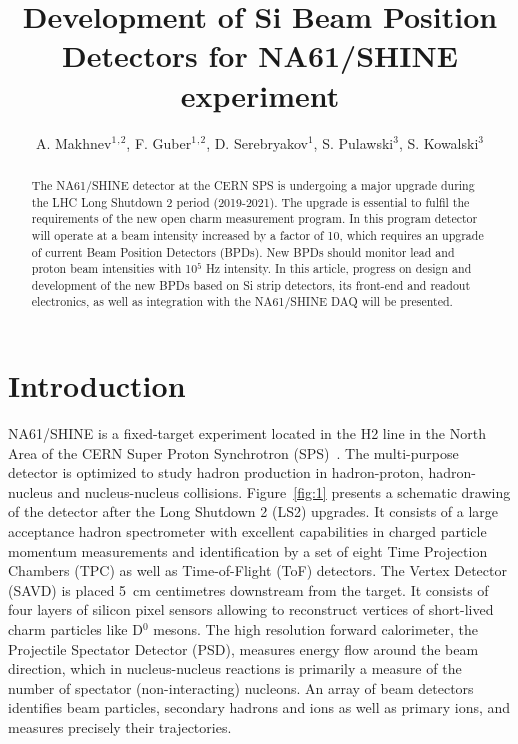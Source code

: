 \documentclass[a4paper]{jpconf}
\begin{document}
\title{Development of Si Beam Position Detectors for NA61/SHINE experiment}

\author{A. Makhnev$^1$$^,$$^2$, F. Guber$^1$$^,$$^2$, D. Serebryakov$^1$, S. Pulawski$^3$, S. Kowalski$^3$}

\address{$^1$Institute for Nuclear Research RAS, Moscow, Russia}
\address{$^2$Moscow Institute of Physics and Technology, Dolgoprudny, Moscow Region, Russia}
\address{$^3$Institute of Physics, University of Silesia, Chorzów, Poland}


\begin{abstract}
The NA61/SHINE detector at the CERN SPS is undergoing a major upgrade during the LHC Long Shutdown 2 period (2019-2021). The upgrade is essential to fulfil the requirements of the new open charm measurement program. In this program detector will operate at a beam intensity increased by a factor of 10, which requires an upgrade of current Beam Position Detectors (BPDs). New BPDs should monitor lead and proton beam intensities with 10$^5$ Hz intensity. In this article, progress on design and development of the new BPDs based on Si strip detectors, its front-end and readout electronics, as well as integration with the NA61/SHINE DAQ will be presented.
\end{abstract}

\section{Introduction}

NA61/SHINE is a fixed-target experiment located in the H2 line in the North Area of the CERN Super Proton Synchrotron (SPS)~\cite{Abgrall:2014fa}. The multi-purpose detector is optimized to study hadron production in hadron-proton, hadron-nucleus and nucleus-nucleus collisions. Figure~\ref{fig:1} presents a schematic drawing of the detector after the Long Shutdown 2 (LS2) upgrades. It consists of a large acceptance hadron spectrometer with excellent capabilities in charged particle momentum measurements and identification by a set of eight Time Projection Chambers (TPC) as well as Time-of-Flight (ToF) detectors. The Vertex Detector (SAVD) is placed 5~cm centimetres downstream from the target. It consists of four layers of silicon pixel sensors allowing to reconstruct vertices of short-lived charm particles like D$^0$ mesons. The high resolution forward calorimeter, the Projectile Spectator Detector (PSD), measures energy flow around the beam direction, which in nucleus-nucleus reactions is primarily a measure of the number of spectator (non-interacting) nucleons. An array of beam detectors identifies beam particles, secondary hadrons and ions as well as primary ions, and measures precisely their trajectories.
\end{document}
